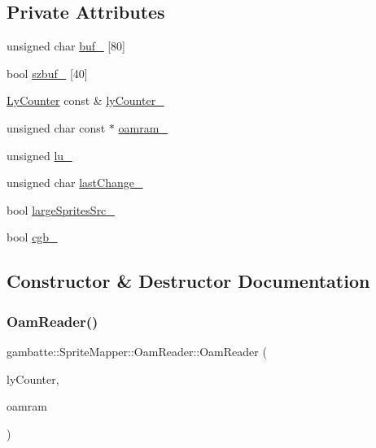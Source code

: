 \subsection*{Private Attributes}
\begin{DoxyCompactItemize}
\item 
unsigned char \hyperlink{classgambatte_1_1SpriteMapper_1_1OamReader_acc0df0fc3ac6e5b0ec5535a764456220}{buf\+\_\+} \mbox{[}80\mbox{]}
\item 
bool \hyperlink{classgambatte_1_1SpriteMapper_1_1OamReader_a283726945791824e8b354e79bc8b4b2c}{szbuf\+\_\+} \mbox{[}40\mbox{]}
\item 
\hyperlink{classgambatte_1_1LyCounter}{Ly\+Counter} const  \& \hyperlink{classgambatte_1_1SpriteMapper_1_1OamReader_a907ad5bb63d28f834455285f6acd57a9}{ly\+Counter\+\_\+}
\item 
unsigned char const  $\ast$ \hyperlink{classgambatte_1_1SpriteMapper_1_1OamReader_acaae688f585201999a41b5aade0726d3}{oamram\+\_\+}
\item 
unsigned \hyperlink{classgambatte_1_1SpriteMapper_1_1OamReader_ae5502dcd770a8dd4ce083532813ea352}{lu\+\_\+}
\item 
unsigned char \hyperlink{classgambatte_1_1SpriteMapper_1_1OamReader_ae77a7aa0390ff2bd933e712802865767}{last\+Change\+\_\+}
\item 
bool \hyperlink{classgambatte_1_1SpriteMapper_1_1OamReader_a4601e1179ad370e055a57c973d999c2d}{large\+Sprites\+Src\+\_\+}
\item 
bool \hyperlink{classgambatte_1_1SpriteMapper_1_1OamReader_abd5aa0b077b867e4bdf3971c34cb6bb7}{cgb\+\_\+}
\end{DoxyCompactItemize}


\subsection{Constructor \& Destructor Documentation}
\mbox{\label{classgambatte_1_1SpriteMapper_1_1OamReader_ab65ab121f0685f5ef664a01bef316dbe}} 
\subsubsection{\texorpdfstring{Oam\+Reader()}{OamReader()}}
{\footnotesize\ttfamily gambatte\+::\+Sprite\+Mapper\+::\+Oam\+Reader\+::\+Oam\+Reader (\begin{DoxyParamCaption}\item[{\hyperlink{classgambatte_1_1LyCounter}{Ly\+Counter} const \&}]{ly\+Counter,  }\item[{unsigned char const $\ast$}]{oamram }\end{DoxyParamCaption})}



